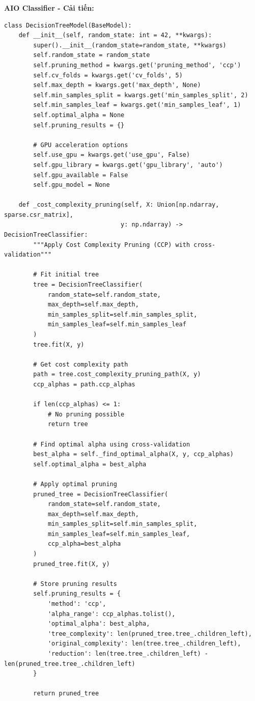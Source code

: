 \textbf{AIO Classifier - Cải tiến:}
\begin{verbatim}
class DecisionTreeModel(BaseModel):
    def __init__(self, random_state: int = 42, **kwargs):
        super().__init__(random_state=random_state, **kwargs)
        self.random_state = random_state
        self.pruning_method = kwargs.get('pruning_method', 'ccp')
        self.cv_folds = kwargs.get('cv_folds', 5)
        self.max_depth = kwargs.get('max_depth', None)
        self.min_samples_split = kwargs.get('min_samples_split', 2)
        self.min_samples_leaf = kwargs.get('min_samples_leaf', 1)
        self.optimal_alpha = None
        self.pruning_results = {}
        
        # GPU acceleration options
        self.use_gpu = kwargs.get('use_gpu', False)
        self.gpu_library = kwargs.get('gpu_library', 'auto')
        self.gpu_available = False
        self.gpu_model = None
        
    def _cost_complexity_pruning(self, X: Union[np.ndarray, sparse.csr_matrix], 
                                y: np.ndarray) -> DecisionTreeClassifier:
        """Apply Cost Complexity Pruning (CCP) with cross-validation"""
        
        # Fit initial tree
        tree = DecisionTreeClassifier(
            random_state=self.random_state,
            max_depth=self.max_depth,
            min_samples_split=self.min_samples_split,
            min_samples_leaf=self.min_samples_leaf
        )
        tree.fit(X, y)
        
        # Get cost complexity path
        path = tree.cost_complexity_pruning_path(X, y)
        ccp_alphas = path.ccp_alphas
        
        if len(ccp_alphas) <= 1:
            # No pruning possible
            return tree
        
        # Find optimal alpha using cross-validation
        best_alpha = self._find_optimal_alpha(X, y, ccp_alphas)
        self.optimal_alpha = best_alpha
        
        # Apply optimal pruning
        pruned_tree = DecisionTreeClassifier(
            random_state=self.random_state,
            max_depth=self.max_depth,
            min_samples_split=self.min_samples_split,
            min_samples_leaf=self.min_samples_leaf,
            ccp_alpha=best_alpha
        )
        pruned_tree.fit(X, y)
        
        # Store pruning results
        self.pruning_results = {
            'method': 'ccp',
            'alpha_range': ccp_alphas.tolist(),
            'optimal_alpha': best_alpha,
            'tree_complexity': len(pruned_tree.tree_.children_left),
            'original_complexity': len(tree.tree_.children_left),
            'reduction': len(tree.tree_.children_left) - len(pruned_tree.tree_.children_left)
        }
        
        return pruned_tree
\end{verbatim}

